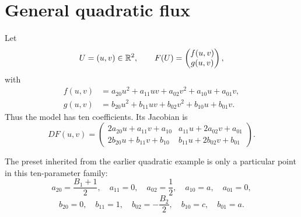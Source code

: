 \section{General quadratic flux}

Let
\[
U=(u,v)\in\mathbb{R}^2,
\qquad
F(U)=\begin{pmatrix}f(u,v)\\ g(u,v)\end{pmatrix},
\]
with
\begin{align*}
f(u,v)&=a_{20}u^2+a_{11}uv+a_{02}v^2+a_{10}u+a_{01}v,\\
g(u,v)&=b_{20}u^2+b_{11}uv+b_{02}v^2+b_{10}u+b_{01}v.
\end{align*}
Thus the model has ten coefficients. Its Jacobian is
\[
DF(u,v)=
\begin{pmatrix}
2a_{20}u+a_{11}v+a_{10} & a_{11}u+2a_{02}v+a_{01}\\
2b_{20}u+b_{11}v+b_{10} & b_{11}u+2b_{02}v+b_{01}
\end{pmatrix}.
\]

The preset inherited from the earlier quadratic example is only a particular point in this ten-parameter family:
\[
a_{20}=\frac{B_1+1}{2},\quad a_{11}=0,\quad a_{02}=\frac12,
\quad a_{10}=a,\quad a_{01}=0,
\]
\[
b_{20}=0,\quad b_{11}=1,\quad b_{02}=-\frac{B_2}{2},
\quad b_{10}=c,\quad b_{01}=a.
\]
